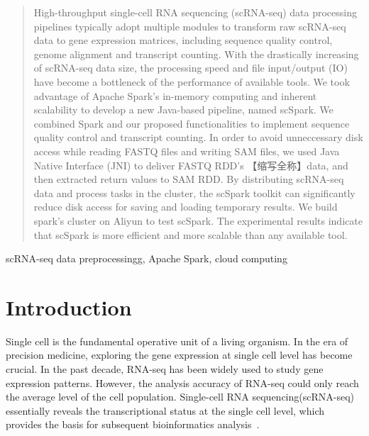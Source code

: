\documentclass[conference]{IEEEtran}
\begin{document}
\begin{abstract}
High-throughput single-cell RNA sequencing (scRNA-seq) data processing pipelines typically adopt multiple modules to transform raw scRNA-seq data to gene expression matrices, including sequence quality control, genome alignment and transcript counting. 
With the drastically increasing of scRNA-seq data size, the processing speed and file input/output (IO) have become a bottleneck of the performance of available tools. 
We took advantage of Apache Spark's in-memory computing and inherent scalability to develop a new Java-based pipeline, named scSpark. 
We combined Spark and our proposed functionalities to implement sequence quality control and transcript counting. 
In order to avoid unneccessary disk access while reading FASTQ files and writing SAM files, we used Java Native Interface (JNI) to deliver FASTQ RDD's 【缩写全称】data, and then extracted return values to SAM RDD. 
By distributing scRNA-seq data and process tasks in the cluster, the scSpark toolkit can significantly reduce disk access for saving and loading temporary results. 
We build spark's cluster on Aliyun to test scSpark. 
The experimental results indicate that scSpark is more efficient and more scalable than any available tool. 
\end{abstract}

\begin{IEEEkeywords}
scRNA-seq data preprocessingg, Apache Spark, cloud computing
\end{IEEEkeywords}

\section{Introduction}
Single cell is the fundamental operative unit of a living organism. In the era of precision medicine, exploring the gene expression at single cell level has become crucial. In the past decade, RNA-seq has been widely used to study gene expression patterns. However, the analysis accuracy of RNA-seq could only reach the average level of the cell population.  Single-cell RNA sequencing(scRNA-seq) essentially reveals the transcriptional status at the single cell level, which provides the basis for subsequent bioinformatics analysis~\cite{Papalexi2018SinglecellRS}. 
\end{document}
